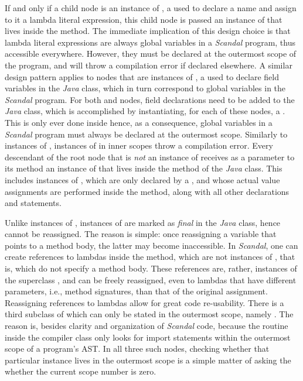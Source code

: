 If and only if a child node is an instance of , a  used to declare a name and assign to it a lambda literal expression, this child node is passed an instance of  that lives inside the  method. The immediate implication of this design choice is that lambda literal expressions are always global variables in a \emph{Scandal} program, thus accessible everywhere. However, they must be declared at the outermost scope of the program, and will throw a compilation error if declared elsewhere. A similar design pattern applies to nodes that are instances of , a  used to declare field variables in the \emph{Java} class, which in turn correspond to global variables in the \emph{Scandal} program. For both  and  nodes, field declarations need to be added to the \emph{Java} class, which is accomplished by instantiating, for each of these nodes, a . This is only ever done inside  hence, as a consequence, global variables in a \emph{Scandal} program must always be declared at the outermost scope. Similarly to instances of , instances of  in inner scopes throw a compilation error. Every descendant of the root node that is \emph{not} an instance of  receives as a parameter to its  method an instance of  that lives inside the  method of the \emph{Java} class. This includes instances of , which are only declared by a , and whose actual value assignments are performed inside the  method, along with all other declarations and statements.

Unlike instances of , instances of  are marked as \emph{final} in the \emph{Java} class, hence cannot be reassigned. The reason is simple: once reassigning a variable that points to a method body, the latter may become inaccessible. In \emph{Scandal}, one can create references to lambdas inside the  method, which are not instances of , that is, which do not specify a method body. These references are, rather, instances of the superclass , and can be freely reassigned, even to lambdas that have different parameters, i.e., method signatures, than that of the original assignment. Reassigning references to lambdas allow for great code re-usability. There is a third subclass of  which can only be stated in the outermost scope, namely . The reason is, besides clarity and organization of \emph{Scandal} code, because the  routine inside the compiler class only looks for import statements within the outermost scope of a program's AST. In all three such nodes, checking whether that particular instance lives in the outermost scope is a simple matter of asking the  whether the current scope number is zero.

